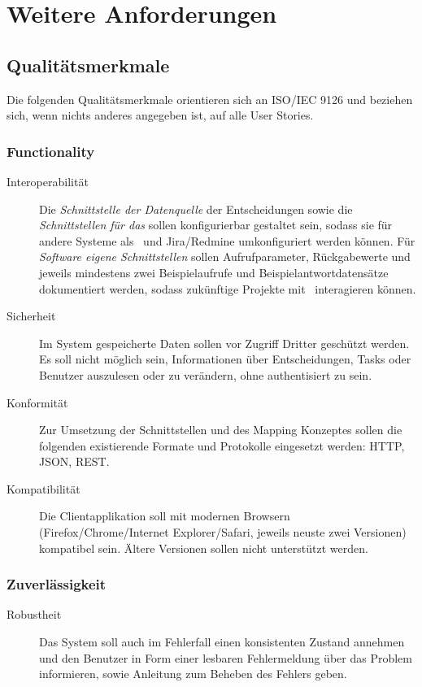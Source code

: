 \section{Weitere Anforderungen}

	\subsection{Qualitätsmerkmale}
		Die folgenden Qualitätsmerkmale orientieren sich an ISO/IEC 9126 \cite{wikipedia_iso/iec_2014} und beziehen sich, wenn nichts anderes angegeben ist, auf alle User Stories.

		\subsubsection{Functionality}
		\begin{description}
			\item[Interoperabilität] Die \textit{Schnittstelle der Datenquelle} der Entscheidungen sowie die \textit{Schnittstellen für das \ppt} sollen konfigurierbar gestaltet sein, sodass sie für andere Systeme als \cdar\ und Jira/Redmine umkonfiguriert werden können. 
			Für \textit{Software eigene Schnittstellen} sollen Aufrufparameter, Rückgabewerte und jeweils mindestens zwei Beispielaufrufe und Beispielantwortdatensätze dokumentiert werden, sodass zukünftige Projekte mit \eeppi\ interagieren können.
			\item[Sicherheit] Im System gespeicherte Daten sollen vor Zugriff Dritter geschützt werden.
			Es soll nicht möglich sein, Informationen über Entscheidungen, Tasks oder Benutzer auszulesen oder zu verändern, 
			ohne authentisiert zu sein.
			\item[Konformität] Zur Umsetzung der Schnittstellen und des Mapping Konzeptes sollen die folgenden existierende Formate und Protokolle eingesetzt werden: HTTP, JSON, REST.
			\item[Kompatibilität] Die Clientapplikation soll mit modernen Browsern (Firefox/Chrome/Internet Explorer/Safari, jeweils neuste zwei Versionen) kompatibel sein. Ältere Versionen sollen nicht unterstützt werden.
		\end{description}
		
		
		\subsubsection{Zuverlässigkeit}
		\begin{description}
			\item[Robustheit] Das System soll auch im Fehlerfall einen konsistenten Zustand annehmen und den Benutzer in Form einer lesbaren Fehlermeldung über das Problem informieren, sowie Anleitung zum Beheben des Fehlers geben.
		\end{description}
		

